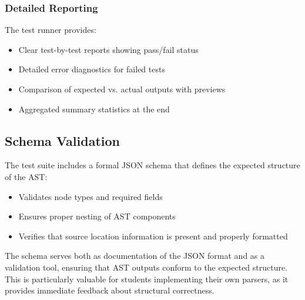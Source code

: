 \subsubsection*{Detailed Reporting}
The test runner provides:
\begin{itemize}
\item Clear test-by-test reports showing pass/fail status
\item Detailed error diagnostics for failed tests
\item Comparison of expected vs. actual outputs with previews
\item Aggregated summary statistics at the end
\end{itemize}
\subsection{Schema Validation}
The test suite includes a formal JSON schema that defines the expected structure of the AST:
\begin{itemize}
\item Validates node types and required fields
\item Ensures proper nesting of AST components
\item Verifies that source location information is present and properly formatted
\end{itemize}
The schema serves both as documentation of the JSON format and as a validation tool, ensuring that AST outputs conform to the expected structure. This is particularly valuable for students implementing their own parsers, as it provides immediate feedback about structural correctness.
